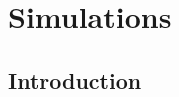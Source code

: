 \documentclass[a4paper,11pt,twoside]{book}
\begin{document}






\part{Simulations}

  \chapter{Introduction}
    \label{chapter:simulations_introduction}
\end{document}
